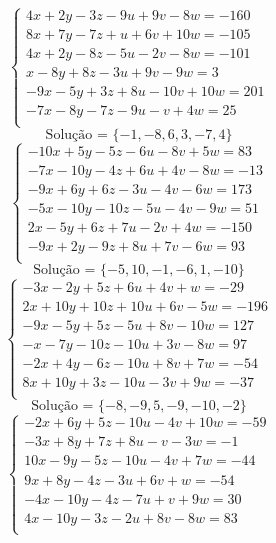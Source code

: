 \documentclass[12pt,oneside,a4paper]{article}
\begin{document}
\vspace{\baselineskip}
\begin{equation*}
\begin{cases}
4x+2y-3z-9u+9v-8w=-160 \\
8x+7y-7z+u+6v+10w=-105 \\
4x+2y-8z-5u-2v-8w=-101 \\
x-8y+8z-3u+9v-9w=3 \\
-9x-5y+3z+8u-10v+10w=201 \\
-7x-8y-7z-9u-v+4w=25 \\
\end{cases}
\end{equation*}
\begin{equation*}
\text{Solução = }\{-1,-8,6,3,-7,4\}
\end{equation*}
\vspace{\baselineskip}
\begin{equation*}
\begin{cases}
-10x+5y-5z-6u-8v+5w=83 \\
-7x-10y-4z+6u+4v-8w=-13 \\
-9x+6y+6z-3u-4v-6w=173 \\
-5x-10y-10z-5u-4v-9w=51 \\
2x-5y+6z+7u-2v+4w=-150 \\
-9x+2y-9z+8u+7v-6w=93 \\
\end{cases}
\end{equation*}
\begin{equation*}
\text{Solução = }\{-5,10,-1,-6,1,-10\}
\end{equation*}
\vspace{\baselineskip}
\begin{equation*}
\begin{cases}
-3x-2y+5z+6u+4v+w=-29 \\
2x+10y+10z+10u+6v-5w=-196 \\
-9x-5y+5z-5u+8v-10w=127 \\
-x-7y-10z-10u+3v-8w=97 \\
-2x+4y-6z-10u+8v+7w=-54 \\
8x+10y+3z-10u-3v+9w=-37 \\
\end{cases}
\end{equation*}
\begin{equation*}
\text{Solução = }\{-8,-9,5,-9,-10,-2\}
\end{equation*}
\vspace{\baselineskip}
\begin{equation*}
\begin{cases}
-2x+6y+5z-10u-4v+10w=-59 \\
-3x+8y+7z+8u-v-3w=-1 \\
10x-9y-5z-10u-4v+7w=-44 \\
9x+8y-4z-3u+6v+w=-54 \\
-4x-10y-4z-7u+v+9w=30 \\
4x-10y-3z-2u+8v-8w=83 \\
\end{cases}
\end{equation*}
\end{document}

